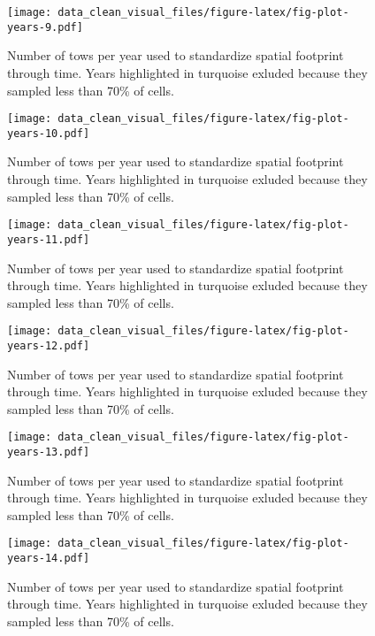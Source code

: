 \documentclass[
]{article}
\begin{document}
\begin{figure}
\centering
\texttt{[image: data\_clean\_visual\_files/figure-latex/fig-plot-years-9.pdf]}
\caption{\label{fig:fig-plot-years-9}Number of tows per year used to standardize spatial footprint through time. Years highlighted in turquoise exluded because they sampled less than 70\% of cells.}
\end{figure}

\begin{figure}
\centering
\texttt{[image: data\_clean\_visual\_files/figure-latex/fig-plot-years-10.pdf]}
\caption{\label{fig:fig-plot-years-10}Number of tows per year used to standardize spatial footprint through time. Years highlighted in turquoise exluded because they sampled less than 70\% of cells.}
\end{figure}

\begin{figure}
\centering
\texttt{[image: data\_clean\_visual\_files/figure-latex/fig-plot-years-11.pdf]}
\caption{\label{fig:fig-plot-years-11}Number of tows per year used to standardize spatial footprint through time. Years highlighted in turquoise exluded because they sampled less than 70\% of cells.}
\end{figure}

\begin{figure}
\centering
\texttt{[image: data\_clean\_visual\_files/figure-latex/fig-plot-years-12.pdf]}
\caption{\label{fig:fig-plot-years-12}Number of tows per year used to standardize spatial footprint through time. Years highlighted in turquoise exluded because they sampled less than 70\% of cells.}
\end{figure}

\begin{figure}
\centering
\texttt{[image: data\_clean\_visual\_files/figure-latex/fig-plot-years-13.pdf]}
\caption{\label{fig:fig-plot-years-13}Number of tows per year used to standardize spatial footprint through time. Years highlighted in turquoise exluded because they sampled less than 70\% of cells.}
\end{figure}

\begin{figure}
\centering
\texttt{[image: data\_clean\_visual\_files/figure-latex/fig-plot-years-14.pdf]}
\caption{\label{fig:fig-plot-years-14}Number of tows per year used to standardize spatial footprint through time. Years highlighted in turquoise exluded because they sampled less than 70\% of cells.}
\end{figure}
\end{document}
